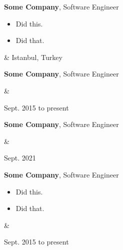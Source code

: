 \documentclass[10pt, letterpaper]{article}
\newenvironment{highlights}{
        \begin{itemize}[
                topsep=0pt,
                parsep=0.10 cm,
                partopsep=0pt,
                itemsep=0pt,
                after=\vspace{-1\baselineskip},
                leftmargin=0.4 cm + 3pt
            ]
    }{
        \end{itemize}
    } %
\let\originalTabularx\tabularx
\let\originalEndTabularx\endtabularx
\renewenvironment{tabularx}{\bgroup\centering\originalTabularx}{\originalEndTabularx\par\egroup}
\begin{document}
        \vspace{0.2 cm}
        \begin{tabularx}{
            \textwidth-0.4 cm-0.13cm
        }{
            K{0.2 cm}
            R{4.1 cm}
        }
            \textbf{Some Company}, Software Engineer

            \vspace{0.10 cm}

            \begin{highlights}
                \item Did this.
                \item Did that.
            \end{highlights}
            &
            Istanbul, Turkey

            
        \end{tabularx}

        \vspace{0.2 cm}
        \begin{tabularx}{
            \textwidth-0.4 cm-0.13cm
        }{
            K{0.2 cm}
            R{4.1 cm}
        }
            \textbf{Some Company}, Software Engineer

            \vspace{0.10 cm}

            &
            

            Sept. 2015 to present
        \end{tabularx}

        \vspace{0.2 cm}
        \begin{tabularx}{
            \textwidth-0.4 cm-0.13cm
        }{
            K{0.2 cm}
            R{4.1 cm}
        }
            \textbf{Some Company}, Software Engineer

            \vspace{0.10 cm}

            &
            

            Sept. 2021
        \end{tabularx}

        \vspace{0.2 cm}
        \begin{tabularx}{
            \textwidth-0.4 cm-0.13cm
        }{
            K{0.2 cm}
            R{4.1 cm}
        }
            \textbf{Some Company}, Software Engineer

            \vspace{0.10 cm}

            \begin{highlights}
                \item Did this.
                \item Did that.
            \end{highlights}
            &
            

            Sept. 2015 to present
        \end{tabularx}
\end{document}
